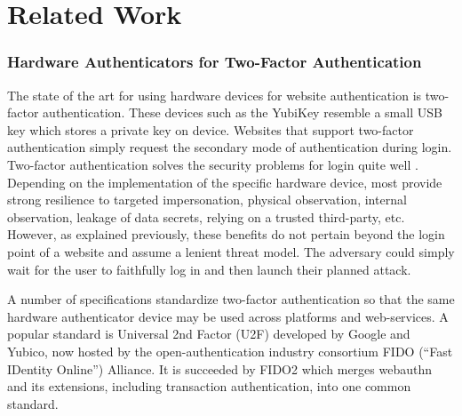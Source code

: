 \chapter{Related Work}

\subsection{Hardware Authenticators for \newline Two-Factor Authentication}\label{Sec:HardwareAuthenticators_2FA}

The state of the art for using hardware devices for website authentication is two-factor authentication. These devices such as the YubiKey \cite{https://www.yubico.com/products/} resemble a small USB key which stores a private key on device. Websites that support two-factor authentication simply request the secondary mode of authentication during login. Two-factor authentication solves the security problems for login quite well \cite{TODO-quest-to-remove-passwords}. Depending on the implementation of the specific hardware device, most provide strong resilience to targeted impersonation, physical observation, internal observation, leakage of data secrets, relying on a trusted third-party, etc. However, as explained previously, these benefits do not pertain beyond the login point of a website and assume a lenient threat model. The adversary could simply wait for the user to faithfully log in and then launch their planned attack. 


A number of specifications standardize two-factor authentication so that the same hardware authenticator device may be used across platforms and web-services. A popular standard is Universal 2nd Factor (U2F) \cite{https://www.yubico.com/authentication-standards/fido-u2f/} developed by Google and Yubico, now hosted by the open-authentication industry consortium FIDO (``Fast IDentity Online'') Alliance. It is succeeded by FIDO2 \cite{https://fidoalliance.org/fido2/} which merges webauthn and its extensions, including transaction authentication, into one common standard.

